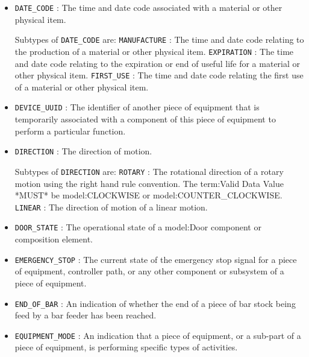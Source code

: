 \begin{itemize}
\item \texttt{DATE_CODE} : The time and date code associated with a material or other physical item. 

Subtypes of \texttt{DATE_CODE} are: 
\newline\tab \texttt{MANUFACTURE} : The time and date code relating to the production of a material or other physical item. 
\newline\tab \texttt{EXPIRATION} : The time and date code relating to the expiration or end of useful life for a material or other physical item. 
\newline\tab \texttt{FIRST_USE} : The time and date code relating the first use of a material or other physical item. 
\item \texttt{DEVICE_UUID} : The identifier of another piece of equipment that is temporarily associated with a component of this piece of equipment to perform a particular function. 

\item \texttt{DIRECTION} : The direction of motion. 

Subtypes of \texttt{DIRECTION} are: 
\newline\tab \texttt{ROTARY} : The rotational direction of a rotary motion using the right hand rule convention.
 The {term:Valid Data Value} *MUST* be {model:CLOCKWISE} or {model:COUNTER_CLOCKWISE}. 
\newline\tab \texttt{LINEAR} : The direction of motion of a linear motion. 
\item \texttt{DOOR_STATE} : The operational state of a {model:Door} component or composition element. 

\item \texttt{EMERGENCY_STOP} : The current state of the emergency stop signal for a piece of equipment, controller path, or any other component or subsystem of a piece of equipment. 

\item \texttt{END_OF_BAR} : An indication of whether the end of a piece of bar stock being feed by a bar feeder has been reached. 

\item \texttt{EQUIPMENT_MODE} : An indication that a piece of equipment, or a sub-part of a piece of equipment, is performing specific types of activities. 


\end{itemize}
